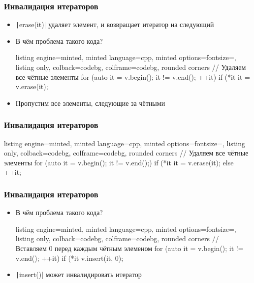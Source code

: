 \documentclass[10pt]{beamer}
\begin{document}
\begin{frame}[fragile]
\frametitle{Инвалидация итераторов}
\begin{itemize}
\item \texttt|erase(it)| удаляет элемент, и возвращает итератор на следующий
\pause
\item В чём проблема такого кода?
\begin{tcblisting}{listing engine=minted, minted language=cpp, minted options={fontsize=\scriptsize}, listing only, colback=codebg, colframe=codebg, rounded corners}
// Удаляем все чётные элементы
for (auto it = v.begin(); it != v.end(); ++it) {
  if (*it %
    it = v.erase(it);
}
\end{tcblisting}
\pause
\item Пропустим все элементы, следующие за чётными
\end{itemize}
\end{frame}

\begin{frame}[fragile]
\frametitle{Инвалидация итераторов}
\begin{itemize}
\begin{tcblisting}{listing engine=minted, minted language=cpp, minted options={fontsize=\scriptsize}, listing only, colback=codebg, colframe=codebg, rounded corners}
// Удаляем все чётные элементы
for (auto it = v.begin(); it != v.end();) {
  if (*it %
    it = v.erase(it);
  else
    ++it;
}
\end{tcblisting}
\end{itemize}
\end{frame}

\begin{frame}[fragile]
\frametitle{Инвалидация итераторов}
\begin{itemize}
\item В чём проблема такого кода?
\begin{tcblisting}{listing engine=minted, minted language=cpp, minted options={fontsize=\scriptsize}, listing only, colback=codebg, colframe=codebg, rounded corners}
// Вставляем 0 перед каждым чётным элеменом
for (auto it = v.begin(); it != v.end(); ++it)
  if (*it %
    v.insert(it, 0);
\end{tcblisting}
\pause
{}
\item \texttt|insert()| может инвалидировать итератор
\end{itemize}
\end{frame}
\end{document}
